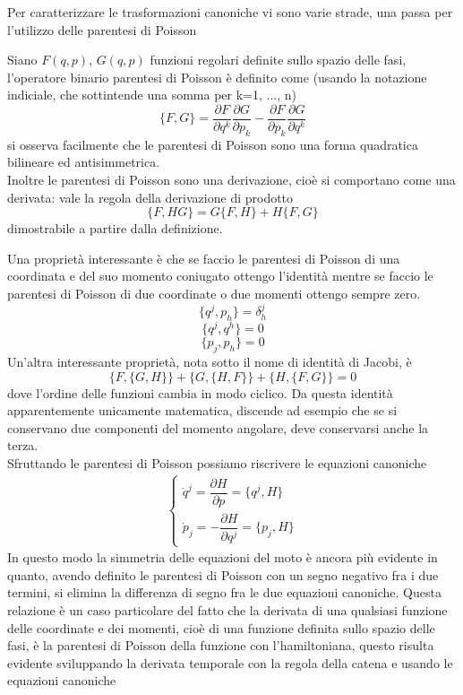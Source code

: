 \documentclass[
10pt, %
a4paper, %
oneside, %
headinclude,footinclude, %
BCOR5mm, %
]{scrartcl}
\begin{document}
Per caratterizzare le trasformazioni canoniche vi sono varie strade, una passa per l'utilizzo delle parentesi di Poisson
\begin{definizione}
	Siano \(F(q, p)\), \(G(q, p)\) funzioni regolari definite sullo spazio delle fasi, l'operatore binario parentesi di Poisson è definito come (usando la notazione indiciale, che sottintende una somma per k=1, ..., n)
	\[\{F, G\} = \frac{\partial F}{\partial q^k}\frac{\partial G}{\partial p_k}-\frac{\partial F}{\partial p_k}\frac{\partial G}{\partial q^k}\]
	si osserva facilmente che le parentesi di Poisson sono una forma quadratica bilineare ed antisimmetrica.\\
	Inoltre le parentesi di Poisson sono una derivazione, cioè si comportano come una derivata: vale la regola della derivazione di prodotto
	\[\{F, HG\} = G\{F, H\}+H\{F, G\}\]
	dimostrabile a partire dalla definizione.
\end{definizione} 
Una proprietà interessante è che se faccio le parentesi di Poisson di una coordinata e del suo momento coniugato ottengo l'identità mentre se faccio le parentesi di Poisson di due coordinate o due momenti ottengo sempre zero.
\[\{q^j, p_h\} = \delta^j_{h}\]
\[\{q^j, q^h\} = 0\]
\[\{p_j, p_h\} = 0\]
Un'altra interessante proprietà, nota sotto il nome di identità di Jacobi, è
\[\{F, \{G, H\}\}+\{G, \{H, F\}\}+\{H, \{F, G\}\} = 0\]
dove l'ordine delle funzioni cambia in modo ciclico. Da questa identità apparentemente unicamente matematica, discende ad esempio che se si conservano due componenti del momento angolare, deve conservarsi anche la terza.\\
Sfruttando le parentesi di Poisson possiamo riscrivere le equazioni canoniche
\begin{align*}
		\begin{cases}
		\dot{q}^j = \dfrac{\partial H}{\partial p} = \{q^j, H\}\\
		\dot{p}_j = -\dfrac{\partial H}{\partial q^j} = \{p_j, H\}
	\end{cases}
\end{align*}
In questo modo la simmetria delle equazioni del moto è ancora più evidente in quanto, avendo definito le parentesi di Poisson con un segno negativo fra i due termini, si elimina la differenza di segno fra le due equazioni canoniche. Questa relazione è un caso particolare del fatto che la derivata di una qualsiasi funzione delle coordinate e dei momenti, cioè di una funzione definita sullo spazio delle fasi, è la parentesi di Poisson della funzione con l'hamiltoniana, questo risulta evidente sviluppando la derivata temporale con la regola della catena e usando le equazioni canoniche
\end{document}
